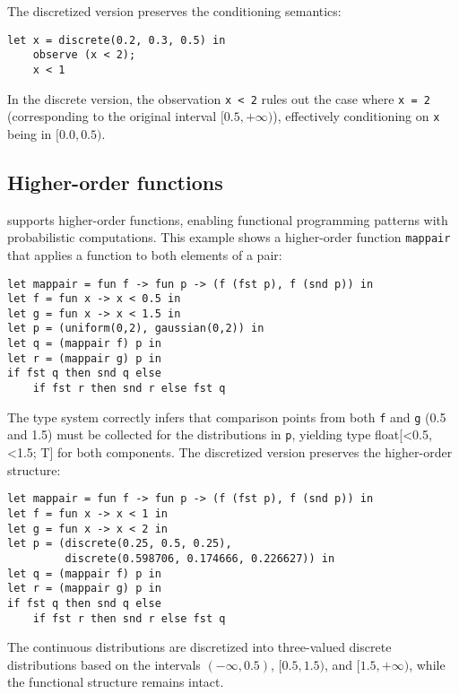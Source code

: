 \documentclass[acmsmall,screen,dvipsnames,x11names,nonacm,anonymous,review]{acmart}
\newcommand{\codetype}[1]{\textcolor{typecolor}{\ttfamily\small#1}}
\newcommand{\Slice}{\text{\scshape Slice}\xspace}
\begin{document}
\noindent The discretized version preserves the conditioning semantics:

\begin{lstlisting}[aboveskip=1em,belowskip=1em]
    let x = discrete(0.2, 0.3, 0.5) in
    observe (x < 2);
    x < 1
\end{lstlisting}

\noindent In the discrete version, the observation \texttt{x < 2} rules out the case where \texttt{x = 2} (corresponding to the original interval $[0.5, +\infty)$), effectively conditioning on \texttt{x} being in $[0.0, 0.5)$.

\subsection{Higher-order functions}

\Slice supports higher-order functions, enabling functional programming patterns with probabilistic computations. This example shows a higher-order function \texttt{mappair} that applies a function to both elements of a pair:

\begin{lstlisting}[aboveskip=1em,belowskip=1em,escapechar=!]
let mappair = fun f -> fun p -> (f (fst p), f (snd p)) in
let f = fun x -> x < 0.5 in
let g = fun x -> x < 1.5 in
let p = (uniform(0,2), gaussian(0,2)) in
let q = (mappair f) p in
let r = (mappair g) p in
if fst q then snd q else 
    if fst r then snd r else fst q
\end{lstlisting}

\noindent The type system correctly infers that comparison points from both \texttt{f} and \texttt{g} (0.5 and 1.5) must be collected for the distributions in \texttt{p}, yielding type \codetype{float[<0.5,<1.5; T]} for both components. The discretized version preserves the higher-order structure:

\begin{lstlisting}[aboveskip=1em,belowskip=1em]
let mappair = fun f -> fun p -> (f (fst p), f (snd p)) in
let f = fun x -> x < 1 in
let g = fun x -> x < 2 in
let p = (discrete(0.25, 0.5, 0.25), 
         discrete(0.598706, 0.174666, 0.226627)) in
let q = (mappair f) p in
let r = (mappair g) p in
if fst q then snd q else 
    if fst r then snd r else fst q
\end{lstlisting}

\noindent The continuous distributions are discretized into three-valued discrete distributions based on the intervals $(-\infty, 0.5)$, $[0.5, 1.5)$, and $[1.5, +\infty)$, while the functional structure remains intact.
\end{document}
